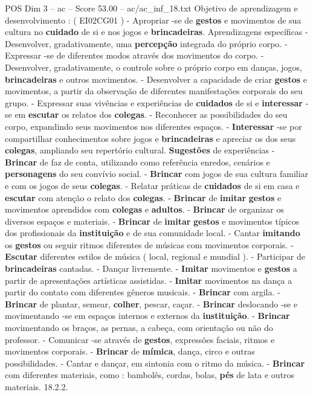 \begin{textsample}{POS Dim 3 – ac – Score 53.00 – ac/ac\_inf\_18.txt}
Objetivo de aprendizagem e desenvolvimento : ( EI02CG01 ) - Apropriar -se de \textbf{gestos} e movimentos de sua cultura no \textbf{cuidado} de si e nos jogos e \textbf{brincadeiras}.
Aprendizagens específicas - Desenvolver, gradativamente, uma \textbf{percepção} integrada do próprio corpo. - Expressar -se de diferentes modos através dos movimentos do corpo. - Desenvolver, gradativamente, o controle sobre o próprio corpo em danças, jogos, \textbf{brincadeiras} e outros movimentos. - Desenvolver a capacidade de criar \textbf{gestos} e movimentos, a partir da observação de diferentes manifestações corporais do seu grupo. - Expressar suas vivências e experiências de \textbf{cuidados} de si e \textbf{interessar} -se em \textbf{escutar} os relatos dos \textbf{colegas}. - Reconhecer as possibilidades do seu corpo, expandindo seus movimentos nos diferentes espaços. - \textbf{Interessar} -se por compartilhar conhecimentos sobre jogos e \textbf{brincadeiras} e apreciar os dos seus \textbf{colegas}, ampliando seu repertório cultural. \textbf{Sugestões} de experiências - \textbf{Brincar} de faz de conta, utilizando como referência enredos, cenários e \textbf{personagens} do seu convívio social. - \textbf{Brincar} com jogos de sua cultura familiar e com os jogos de seus \textbf{colegas}. - Relatar práticas de \textbf{cuidados} de si em casa e \textbf{escutar} com atenção o relato dos \textbf{colegas}. - \textbf{Brincar} de \textbf{imitar} \textbf{gestos} e movimentos aprendidos com \textbf{colegas} e \textbf{adultos}. - \textbf{Brincar} de organizar os diversos espaços e materiais. - \textbf{Brincar} de \textbf{imitar} \textbf{gestos} e movimentos típicos dos profissionais da \textbf{instituição} e de sua comunidade local. - Cantar \textbf{imitando} os \textbf{gestos} ou seguir ritmos diferentes de músicas com movimentos corporais. - \textbf{Escutar} diferentes estilos de música ( local, regional e mundial ). - Participar de \textbf{brincadeiras} cantadas. - Dançar livremente. - \textbf{Imitar} movimentos e \textbf{gestos} a partir de apresentações artísticas assistidas. - \textbf{Imitar} movimentos na dança a partir do contato com diferentes gêneros musicais. - \textbf{Brincar} com argila. - \textbf{Brincar} de plantar, semear, \textbf{colher}, pescar, caçar. - \textbf{Brincar} deslocando -se e movimentando -se em espaços internos e externos da \textbf{instituição}. - \textbf{Brincar} movimentando os braços, as pernas, a cabeça, com orientação ou não do professor. - Comunicar -se através de \textbf{gestos}, expressões faciais, ritmos e movimentos corporais. - \textbf{Brincar} de \textbf{mímica}, dança, circo e outras possibilidades. - Cantar e dançar, em sintonia com o ritmo da música. - \textbf{Brincar} com diferentes materiais, como : bambolês, cordas, bolas, \textbf{pés} de lata e outros materiais. 18.2.2.

\end{textsample}
